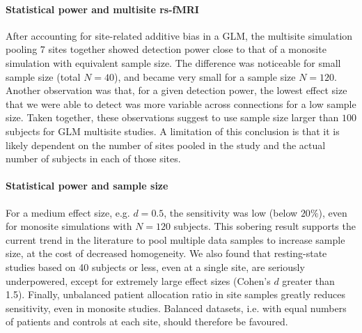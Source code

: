 \documentclass[authoryear]{elsarticle}
\begin{document}
\paragraph{Statistical power and multisite rs-fMRI} After accounting for site-related additive bias in a GLM, the multisite simulation pooling 7 sites together showed detection power close to that of a monosite simulation with equivalent sample size. The difference was noticeable for small sample size (total $N=40$), and became very small for a sample size $N=120$. Another observation was that, for a given detection power, the lowest effect size that we were able to detect was more variable across connections for a low sample size. Taken together, these observations suggest to use sample size larger than $100$ subjects for GLM multisite studies. A limitation of this conclusion is that it is likely dependent on the number of sites pooled in the study and the actual number of subjects in each of those sites. 

\paragraph{Statistical power and sample size} For a medium effect size, e.g. $d=0.5$, the sensitivity was low (below $20\%$), even for monosite simulations with $N=120$ subjects. This sobering result supports the current trend in the literature to pool multiple data samples to increase sample size, at the cost of decreased homogeneity. We also found that resting-state studies based on 40 subjects or less, even at a single site, are seriously underpowered, except for extremely large effect sizes (Cohen's $d$ greater than 1.5). Finally, unbalanced patient allocation ratio in site samples greatly reduces sensitivity, even in monosite studies. Balanced datasets, i.e. with equal numbers of patients and controls at each site, should therefore be favoured. 
\end{document}
